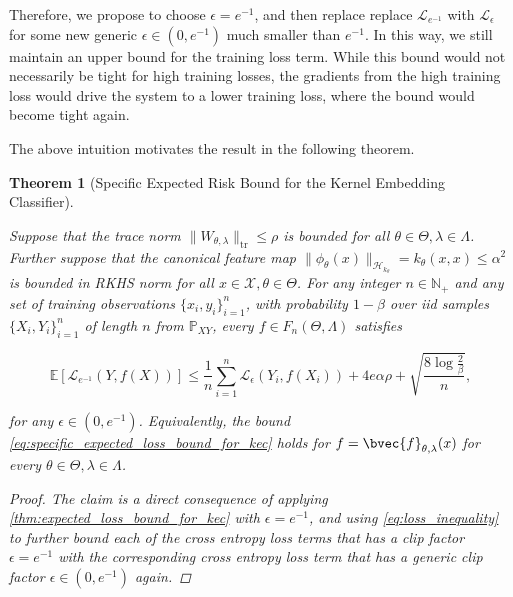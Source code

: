 \documentclass{article}
\newtheorem{theorem}{Theorem}[section]
\begin{document}
		Therefore, we propose to choose $\epsilon = e^{-1}$, and then replace replace $\mathcal{L}_{e^{-1}}$ with $\mathcal{L}_{\epsilon}$ for some new generic $\epsilon \in (0, e^{-1})$ much smaller than $e^{-1}$. In this way, we still maintain an upper bound for the training loss term. While this bound would not necessarily be tight for high training losses, the gradients from the high training loss would drive the system to a lower training loss, where the bound would become tight again.
		
		The above intuition motivates the result in the following theorem.
	
		\begin{theorem}[Specific Expected Risk Bound for the Kernel Embedding Classifier]
			\label{thm:specific_expected_loss_bound_for_kec}
			
			Suppose that the trace norm $\| W_{\theta, \lambda} \|_{\mathrm{tr}} \leq \rho$ is bounded for all $\theta \in \Theta, \lambda \in \Lambda$. Further suppose that the canonical feature map $\| \phi_{\theta}(x) \|_{\mathcal{H}_{k_{\theta}}} = k_{\theta}(x, x) \leq \alpha^{2}$ is bounded in RKHS norm for all $x \in \mathcal{X}, \theta \in \Theta$. For any integer $n \in \mathbb{N}_{+}$ and any set of training observations $\{x_{i}, y_{i}\}_{i = 1}^{n}$, with probability $1 - \beta$ over \textit{iid} samples $\{X_{i}, Y_{i}\}_{i = 1}^{n}$ of length $n$ from $\mathbb{P}_{X Y}$, every $f \in F_{n}(\Theta, \Lambda)$ satisfies
			
			\begin{equation}
			\mathbb{E}[\mathcal{L}_{e^{-1}}(Y, f(X))] \leq \frac{1}{n} \sum_{i = 1}^{n} \mathcal{L}_{\epsilon}(Y_{i}, f(X_{i})) + 4 e \alpha \rho + \sqrt{\frac{8 \log{\frac{2}{\beta}}}{n}},
			\label{eq:specific_expected_loss_bound_for_kec}
			\end{equation}
			
			for any $\epsilon \in (0, e^{-1})$. Equivalently, the bound \eqref{eq:specific_expected_loss_bound_for_kec} holds for $f = \bvec{f}_{\theta, \lambda}(x)$ for every $\theta \in \Theta, \lambda \in \Lambda$.
			
			\begin{proof}
				The claim is a direct consequence of applying \cref{thm:expected_loss_bound_for_kec} with $\epsilon = e^{-1}$, and using \eqref{eq:loss_inequality} to further bound each of the cross entropy loss terms that has a clip factor $\epsilon = e^{-1}$ with the corresponding cross entropy loss term that has a generic clip factor $\epsilon \in (0, e^{-1})$ again.
				

\end{proof}
\end{theorem}
\end{document}
